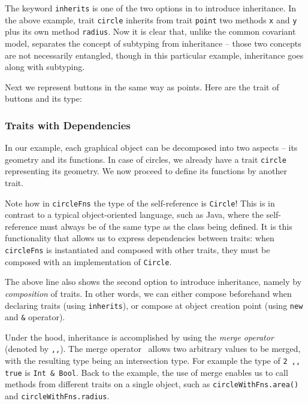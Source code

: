 The keyword \lstinline{inherits} is one of the two options in \name to introduce
inheritance. In the above example, trait \lstinline{circle} inherits from trait
\lstinline{point} two methods \lstinline{x} and \lstinline{y} plus its own
method \lstinline{radius}. Now it is clear that, unlike the common covariant
model, \name separates the concept of subtyping from inheritance -- those two
concepts are not necessarily entangled, though in this particular example,
inheritance goes along with subtyping.

Next we represent buttons in the same way as points. Here are the trait of
buttons and its type:

\subsubsection{Traits with Dependencies}

In our example, each graphical object can be decomposed into two aspects -- its
geometry and its functions. In case of circles, we already have a trait
\lstinline{circle} representing its geometry. We now proceed to define its
functions by another trait.

Note how in \lstinline$circleFns$ the type of the self-reference is
\lstinline$Circle$! This is in contrast to a typical object-oriented language,
such as Java, where the self-reference must always be of the same type as the
class being defined. It is this functionality that allows us to express
dependencies between traits: when \lstinline$circleFns$ is instantiated and
composed with other traits, they must be composed with an implementation of
\lstinline$Circle$.

The above line also shows the second option to introduce inheritance, namely by
\textit{composition} of traits. In other words, we can either compose beforehand
when declaring traits (using \lstinline{inherits}), or compose at object
creation point (using \lstinline{new} and \lstinline{&} operator).

Under the hood, inheritance is accomplished by using the \textit{merge operator}
(denoted by \lstinline{,,}). The merge operator~\cite{dunfield2014elaborating}
allows two arbitrary values to be merged, with the resulting type being an
intersection type. For example the type of \lstinline{2 ,, true} is
\lstinline{Int & Bool}. Back to the example, the use of merge enables us to call
methods from different traits on a single object, such as
\lstinline{circleWithFns.area()} and \lstinline{circleWithFns.radius}.

